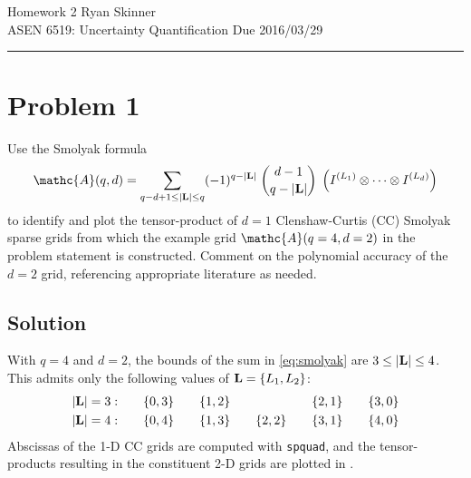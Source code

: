 \documentclass[11pt]{article}
\begin{document}
\newcommand{\widesim}[2][1.5]{
  \mathrel{\overset{#2}{\scalebox{#1}[1]{$\sim$}}}
}

\pagestyle{fancyplain}
\lhead{}
\chead{}
\rhead{}
\cfoot{\hrule \thepage}

\noindent
{\Large Homework 2}
\hfill
{\large Ryan Skinner}
\\[0.5ex]
{\large ASEN 6519: Uncertainty Quantification}
\hfill
{\large Due 2016/03/29}\\
\hrule
\vspace{6pt}

\section*{Problem 1} %

Use the Smolyak formula
\begin{equation}
\mathc{A}(q,d) = \sum_{q-d+1 \le |\mb{L}| \le q} (-1)^{q-|\mb{L}|} \; \binom{d-1}{q-|\mb{L}|} \; \left( I^{(L_1)} \otimes \cdots \otimes I^{(L_d)} \right)
\label{eq:smolyak}
\end{equation}
to identify and plot the tensor-product of $d=1$ Clenshaw-Curtis (CC) Smolyak sparse grids from which the example grid $\mathc{A}(q=4,d=2)$ in the problem statement is constructed. Comment on the polynomial accuracy of the $d=2$ grid, referencing appropriate literature as needed.

\subsection*{Solution}

With $q=4$ and $d=2$, the bounds of the sum in \eqref{eq:smolyak} are $3 \le |\mb{L}| \le 4$. This admits only the following values of $\mb{L} = \{ L_1, L_2 \}$:
\begin{align*}
|\mb{L}| = 3: &\qquad \{ 0,3 \} \qquad \{ 1,2 \} \qquad \hphantom{\{ 2,2 \}} \qquad \{ 2,1 \} \qquad \{ 3,0 \} \\
|\mb{L}| = 4: &\qquad \{ 0,4 \} \qquad \{ 1,3 \} \qquad \{ 2,2 \} \qquad \{ 3,1 \} \qquad \{ 4,0 \}
\end{align*}
Abscissas of the 1-D CC grids are computed with \lstinline|spquad|, and the tensor-products resulting in the constituent 2-D grids are plotted in .
\end{document}
